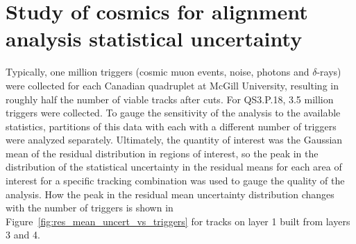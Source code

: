 
\chapter[Analysis statistics]{Study of cosmics for alignment analysis statistical uncertainty}
\label{appendix:statistics}


Typically, one million triggers (cosmic muon events, noise, photons and $\delta$-rays) were collected for each Canadian quadruplet at McGill University, resulting in roughly half the number of viable tracks after cuts. For QS3.P.18, 3.5 million triggers were collected. To gauge the sensitivity of the analysis to the available statistics, partitions of this data with each with a different number of triggers were analyzed separately. Ultimately, the quantity of interest was the Gaussian mean of the residual distribution in regions of interest, so the peak in the distribution of the statistical uncertainty in the residual means for each area of interest for a specific tracking combination was used to gauge the quality of the analysis. How the peak in the residual mean uncertainty distribution changes with the number of triggers is shown in Figure~\ref{fig:res_mean_uncert_vs_triggers} for tracks on layer 1 built from layers 3 and 4. 

